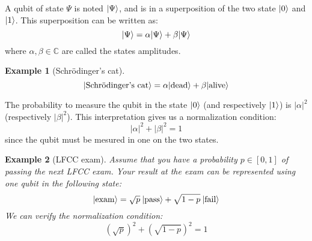 \documentclass[12pt,a4paper]{article}
\newtheorem*{example}{Example}
\DeclarePairedDelimiter\ket{\lvert}{\rangle}
\begin{document}
A qubit of state $\Psi$ is noted $\ket{\Psi}$, and is in a superposition of the two state $\ket{0}$ and $\ket{1}$. This superposition can be written as:
\begin{equation*}
    \ket{\Psi}=\alpha\ket{\Psi}+\beta\ket{\Psi}
\end{equation*}
where $\alpha, \beta\in \mathbb{C}$ are called the states amplitudes. 

\begin{example}[Schrödinger's cat]
    \begin{equation*}
        \ket{\textnormal{Schrödinger's cat}} = \alpha\ket{\textnormal{dead}} + \beta\ket{\textnormal{alive}}
    \end{equation*}
\end{example}

The probability to measure the qubit in the state $\ket{0}$ (and respectively $\ket{1}$) is $|\alpha|^2$ (respectively $|\beta|^2$). This interpretation gives us a normalization condition:
\begin{equation*}
    |\alpha|^2+|\beta|^2=1
\end{equation*}
since the qubit must be mesured in one on the two states.

\begin{example}[LFCC exam]
    Assume that you have a probability $p\in[0, 1]$ of passing the next LFCC exam. Your result at the exam can be represented using one qubit in the following state:
    \begin{equation*}
        \ket{\textnormal{exam}} = \sqrt{p} \: \ket{\textnormal{pass}}+\sqrt{1-p} \: \ket{\textnormal{fail}}
    \end{equation*}
    We can verify the normalization condition:
    \begin{equation*}
        (\sqrt{p})^2 + (\sqrt{1-p})^2 = 1
    \end{equation*}
\end{example}
\end{document}
